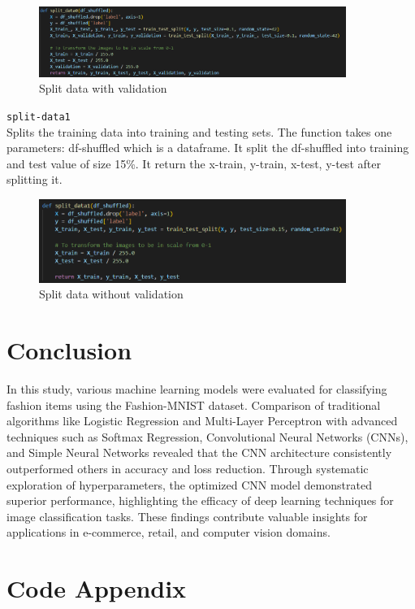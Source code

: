 \documentclass{article}
\newcommand{\code}[1]{\colorbox{light-gray}{\texttt{#1}}}
\begin{document}
\begin{figure}[H]
    \caption{Split data with validation}
    \centering
    \includegraphics[width=10cm]{../imgFolder/splitData0.png}
\end{figure}

\code{split-data1}\\
Splits the training data into training and testing sets.
The function takes one parameters: df-shuffled which is a dataframe.
It split the df-shuffled into training and test value of size 15\%.
It return the x-train, y-train, x-test, y-test after splitting it.
\begin{figure}[H]
    \caption{Split data without validation}
    \centering
    \includegraphics[width=10cm]{../imgFolder/splitData1.png}
\end{figure}

\section{Conclusion}
In this study, various machine learning models were evaluated for classifying fashion items using the Fashion-MNIST dataset.
Comparison of traditional algorithms like Logistic Regression and Multi-Layer Perceptron with advanced techniques such as Softmax Regression, Convolutional Neural Networks (CNNs), and Simple Neural Networks revealed that the CNN architecture consistently outperformed others in accuracy and loss reduction.
Through systematic exploration of hyperparameters, the optimized CNN model demonstrated superior performance, highlighting the efficacy of deep learning techniques for image classification tasks.
These findings contribute valuable insights for applications in e-commerce, retail, and computer vision domains.

\newpage
\section{Code Appendix}
\end{document}
